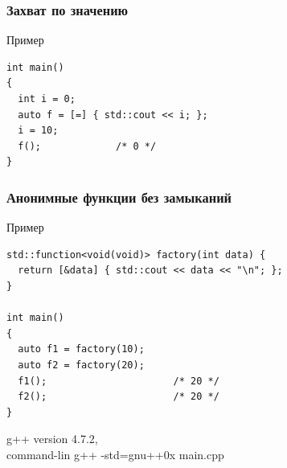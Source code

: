 \documentclass[roman,12pt]{beamer}
\begin{document}
\begin{frame}[fragile]
  \frametitle{Захват по значению}
 \begin{block}{Пример}
    \begin{lstlisting}
int main()
{
  int i = 0;
  auto f = [=] { std::cout << i; };
  i = 10;
  f();             /* 0 */
}   
    \end{lstlisting}
  \end{block} 
\end{frame}
  
\begin{frame}[fragile]
  \frametitle{Анонимные функции без замыканий}
 \begin{block}{Пример}
   \begin{lstlisting}
std::function<void(void)> factory(int data) {
  return [&data] { std::cout << data << "\n"; };
}

int main()
{
  auto f1 = factory(10);
  auto f2 = factory(20);
  f1();                      /* 20 */
  f2();                      /* 20 */
}
   \end{lstlisting}
 \end{block} 

g++ version 4.7.2, \\
command-lin g++ -std=gnu++0x main.cpp
 
\end{frame}
\end{document}
